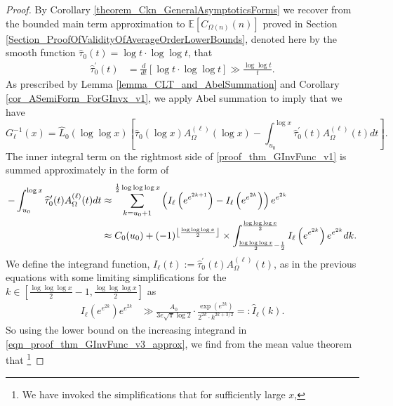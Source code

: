 \documentclass[11pt,reqno,a4letter]{article}
\numberwithin{figure}{section}
\numberwithin{table}{section}
\newcommand{\Floor}[2]{\ensuremath{\left\lfloor \frac{#1}{#2} \right\rfloor}}
\theoremstyle{plain}
\numberwithin{theorem}{section}
\theoremstyle{definition}
\newcommand{\SuccSim}[0]{\overset{_{\scriptsize{\blacktriangle}}}{\succsim}}
\renewcommand{\SuccSim}[0]{\ensuremath{\gg}}
\begin{document}
\begin{proof}
By Corollary \ref{theorem_Ckn_GeneralAsymptoticsForms} 
we recover from the bounded main term approximation to $\mathbb{E}[C_{\Omega(n)}(n)]$ proved in 
Section \ref{Section_ProofOfValidityOfAverageOrderLowerBounds}, denoted here by the smooth function 
$\widehat{\tau}_0(t) = \log t \cdot \log\log t$, that 
\begin{align*} 
\widehat{\tau}_0^{\prime}(t) & = \frac{d}{dt}\left[ 
     \log t \cdot \log\log t 
     \right] \SuccSim \frac{\log\log t}{t}. 
\end{align*} 
As prescribed by Lemma \ref{lemma_CLT_and_AbelSummation} and Corollary \ref{cor_ASemiForm_ForGInvx_v1}, 
we apply Abel summation to imply that we have 
\begin{equation} 
\label{proof_thm_GInvFunc_v1} 
G_{\ell}^{-1}(x) = \widehat{L}_0(\log\log x) \left[
     \widehat{\tau}_0(\log x) A_{\Omega}^{(\ell)}(\log x) - 
     \int_{u_0}^{\log x} 
     \widehat{\tau}_0^{\prime}(t) A_{\Omega}^{(\ell)}(t) dt\right]. 
\end{equation} 
The inner integral term on the rightmost side of \eqref{proof_thm_GInvFunc_v1} 
is summed approximately in the form of 
\begin{align} 
\label{eqn_proof_thm_GInvFunc_v3_approx} 
-\int_{u_0}^{\log x} \widehat{\tau}_0^{\prime}(t) A_{\Omega}^{(\ell)}(t) dt & \approx 
     \sum_{k=u_0+1}^{\frac{1}{2}\log\log\log x} \left( 
     I_{\ell}\left(e^{e^{2k+1}}\right) - 
     I_{\ell}\left(e^{e^{2k}}\right) 
     \right) e^{e^{2k}} \\ 
\notag 
     & \approx 
     C_0(u_0) + 
     (-1)^{\Floor{\log\log\log x}{2}} \times 
     \int_{\frac{\log\log\log x}{2}-\frac{1}{2}}^{\frac{\log\log\log x}{2}} 
     I_{\ell}\left(e^{e^{2k}}\right) 
     e^{e^{2k}} dk. 
\end{align} 
We define the integrand function, 
$I_{\ell}(t) := \widehat{\tau}_0^{\prime}(t) A_{\Omega}^{(\ell)}(t)$, 
as in the previous equations with some limiting simplifications for the 
$k \in \left[\frac{\log\log\log x}{2}-1, \frac{\log\log\log x}{2}\right]$ as 
\begin{align} 
\label{eqn_proof_thm_GInvFunc_v3_approx} 
I_{\ell}\left(e^{e^{2k}}\right) e^{e^{2k}}& \SuccSim 
     \frac{A_0}{3e \sqrt{\pi} \log 2} \cdot \frac{\exp\left(e^{2k}\right)}{2^{2k} \cdot k^{2k+3/2}} 
     =: \widehat{I}_{\ell}(k). 
\end{align} 
So using the lower bound on the increasing integrand in 
\eqref{eqn_proof_thm_GInvFunc_v3_approx}, we find from the mean value theorem 
that \footnote{ 
     We have invoked the simplifications that for sufficiently large $x$, 
}
\end{proof}
\end{document}
